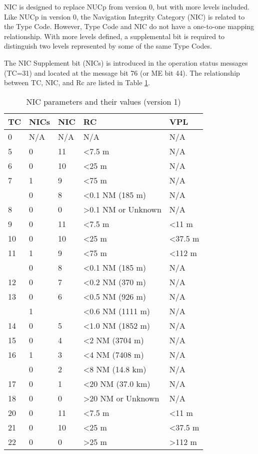 NIC is designed to replace NUCp from version 0, but with more levels included. Like NUCp in version 0, the Navigation Integrity Category (NIC) is related to the Type Code. However, Type Code and NIC do not have a one-to-one mapping relationship. With more levels defined, a supplemental bit is required to distinguish two levels represented by some of the same Type Codes.

The NIC Supplement bit (NICs) is introduced in the operation status messages (TC=31) and located at the message bit 76 (or ME bit 44). The relationship between TC, NIC, and Rc are listed in Table \ref{tb:nic-params-v1}.

\begin{table}[!ht]
\caption{NIC parameters and their values (version 1)}
\label{tb:nic-params-v1}
\begin{tabular}{|l|l|l|l|l|}
\hline
\textbf{TC} & \textbf{NICs} & \textbf{NIC} & \textbf{RC} & \textbf{VPL} \\ \hline \hline
0 & N/A & N/A & N/A & N/A \\ \hline
5 & 0 & 11 & \textless 7.5 m & N/A \\ \hline
6 & 0 & 10 & \textless 25 m & N/A \\ \hline
7 & 1 & 9 & \textless 75 m & N/A \\ \cline{2-5}
 & 0 & 8 & \textless 0.1 NM (185 m) & N/A \\ \hline
8 & 0 & 0 & \textgreater 0.1 NM or Unknown & N/A \\ \hline
\hline
9 & 0 & 11 & \textless 7.5 m & \textless 11 m \\ \hline
10 & 0 & 10 & \textless 25 m & \textless 37.5 m \\ \hline
11 & 1 & 9 & \textless 75 m & \textless 112 m \\ \cline{2-5}
 & 0 & 8 & \textless 0.1 NM (185 m) & N/A \\ \hline
12 & 0 & 7 & \textless 0.2 NM (370 m) & N/A \\ \hline
13 & 0 & 6 & \textless 0.5 NM (926 m) & N/A \\ \cline{2-2} \cline{4-5}
 & 1 &  & \textless 0.6 NM (1111 m) & N/A \\ \hline
14 & 0 & 5 & \textless 1.0 NM (1852 m) & N/A \\ \hline
15 & 0 & 4 & \textless 2 NM (3704 m) & N/A \\ \hline
16 & 1 & 3 & \textless 4 NM (7408 m) & N/A \\ \cline{2-5}
 & 0 & 2 & \textless 8 NM (14.8 km) & N/A \\ \hline
17 & 0 & 1 & \textless 20 NM (37.0 km) & N/A \\ \hline
18 & 0 & 0 & \textgreater 20 NM or Unknown & N/A \\ \hline
\hline
20 & 0 & 11 & \textless 7.5 m & \textless 11 m \\ \hline
21 & 0 & 10 & \textless 25 m & \textless 37.5 m \\ \hline
22 & 0 & 0 & \textgreater 25 m & \textgreater 112 m \\ \hline
\end{tabular}
\end{table}

